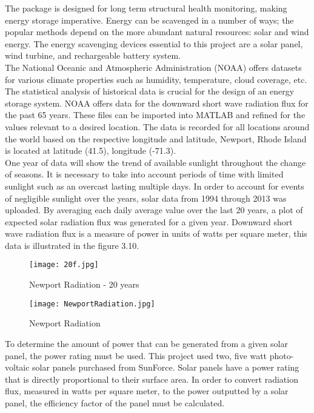 \indent The package is designed for long term structural health monitoring, making energy storage imperative.  Energy can be scavenged in a number of ways; the popular methods depend on the more abundant natural resources: solar and wind energy. The energy scavenging devices essential to this project are a solar panel, wind turbine, and rechargeable battery system.\\

\indent The National Oceanic and Atmospheric Administration (NOAA) offers datasets for various climate properties such as humidity, temperature, cloud coverage, etc. The statistical analysis of historical data is crucial for the design of an energy storage system. NOAA offers data for the downward short wave radiation flux for the past 65 years. These files can be imported into MATLAB and refined for the values relevant to a desired location. The data is recorded for all locations around the world based on the respective longitude and latitude, Newport, Rhode Island is located at latitude (41.5), longitude (-71.3). \\

\indent One year of data will show the trend of available sunlight throughout the change of seasons. It is necessary to take into account periods of time with limited sunlight such as an overcast lasting multiple days. In order to account for events of negligible sunlight over the years, solar data from 1994 through 2013 was uploaded. By averaging each daily average value over the last 20 years, a plot of expected solar radiation flux was generated for a given year. Downward short wave radiation flux is a measure of power in units of watts per square meter, this data is illustrated in the figure 3.10.

\begin{figure}[H]
\centering
\texttt{[image: 20f.jpg]}
\caption{Newport Radiation - 20 years}
\label{fig:20 NewportRadtiation}
\end{figure}
\begin{figure}[H]
\centering
\texttt{[image: NewportRadiation.jpg]}
\caption{Newport Radiation}
\label{fig:NewportRadtiation}
\end{figure}

\indent To determine the amount of power that can be generated from a given solar panel, the power rating must be used. This project used two, five watt photo-voltaic solar panels purchased from SunForce. Solar panels have a power rating that is directly proportional to their surface area. In order to convert radiation flux, measured in watts per square meter, to the power outputted by a solar panel, the efficiency factor of the panel must be calculated.

